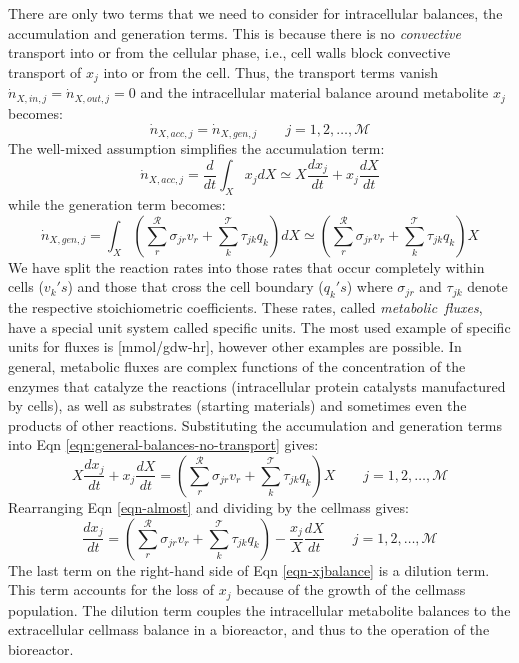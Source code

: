 \documentclass[11pt]{article}
\theoremstyle{definition}
\begin{document}
There are only two terms that we need to consider for intracellular balances, the accumulation and generation terms.
This is because there is no \emph{convective} transport into or from the cellular phase, i.e., cell walls block convective transport of $x_{j}$
into or from the cell. Thus, the transport terms vanish $\dot{n}_{X,in,j} = \dot{n}_{X,out,j} = 0$ and the intracellular material balance around
metabolite $x_{j}$ becomes:
\begin{equation}\label{eqn:general-balances-no-transport}
\dot{n}_{X,acc,j} = \dot{n}_{X,gen,j}\qquad{j=1,2,\hdots,\mathcal{M}}
\end{equation}
The well-mixed assumption simplifies the accumulation term:
\begin{equation}\label{eqn-accumulation}
\dot{n}_{X,acc,j} = \frac{d}{dt}\int_{X}x_{j}dX\simeq X\frac{dx_{j}}{dt} + x_{j}\frac{dX}{dt}
\end{equation}while the generation term becomes:
\begin{equation}\label{eqn-generation}
\dot{n}_{X,gen,j} = \int_{X}\left(\displaystyle\sum_{r}^{\mathcal{R}}\sigma_{jr}v_{r} + \displaystyle\sum_{k}^{\mathcal{T}}\tau_{jk}q_{k}\right)dX \simeq \left(\displaystyle\sum_{r}^{\mathcal{R}}\sigma_{jr}v_{r} + \displaystyle\sum_{k}^{\mathcal{T}}\tau_{jk}q_{k}\right)X
\end{equation}We have split the reaction rates into those rates that occur completely within cells ($v_{k}'s$) and those that cross the cell boundary
($q_{k}'s$) where $\sigma_{jr}$ and $\tau_{jk}$ denote the respective stoichiometric coefficients.
These rates, called \textit{metabolic~fluxes}, have a special unit system called specific units.
The most used example of specific units for fluxes is [mmol/gdw-hr], however other examples are possible.
In general, metabolic fluxes are complex functions of the concentration of the enzymes that catalyze the reactions (intracellular protein catalysts manufactured by cells),
as well as substrates (starting materials) and sometimes even the products of other reactions.
Substituting the accumulation and generation terms into
Eqn \eqref{eqn:general-balances-no-transport} gives:
\begin{equation}\label{eqn-almost}
X\frac{dx_{j}}{dt} + x_{j}\frac{dX}{dt} = \left(\displaystyle\sum_{r}^{\mathcal{R}}\sigma_{jr}v_{r} + \displaystyle\sum_{k}^{\mathcal{T}}\tau_{jk}q_{k}\right)X
\qquad{j=1,2,\hdots,\mathcal{M}}
\end{equation}Rearranging Eqn \eqref{eqn-almost} and dividing by the cellmass gives:
\begin{equation}\label{eqn-xjbalance}
\frac{dx_{j}}{dt} = \left(\displaystyle\sum_{r}^{\mathcal{R}}\sigma_{jr}v_{r} + \displaystyle\sum_{k}^{\mathcal{T}}\tau_{jk}q_{k}\right) - \frac{x_{j}}{X}\frac{dX}{dt}
\qquad{j=1,2,\hdots,\mathcal{M}}
\end{equation}The last term on the right-hand side of Eqn \eqref{eqn-xjbalance} is a dilution term.
This term accounts for the loss of $x_{j}$ because of the growth of the cellmass population.
The dilution term couples the intracellular metabolite balances to the extracellular cellmass balance in a bioreactor, and thus to the operation of the bioreactor.
\end{document}
